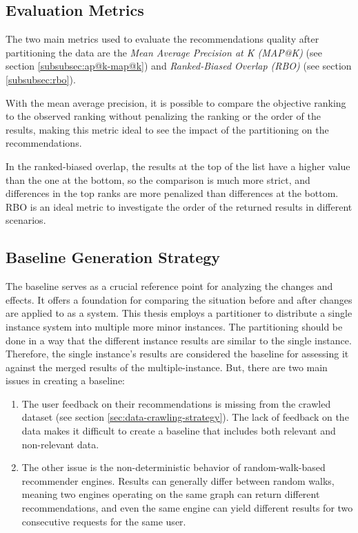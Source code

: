 \subsection{Evaluation Metrics}
\label{subsec:evaluation-metrics-for-recommendation-quality}
The two main metrics used to evaluate the recommendations quality after partitioning the data are the \emph{Mean Average Precision at K (MAP@K)} (see section \ref{subsubsec:ap@k-map@k})  and \emph{Ranked-Biased Overlap (RBO)} (see section \ref{subsubsec:rbo}). 


With the mean average precision, it is possible to compare the objective ranking to the observed ranking without penalizing the ranking or the order of the results, making this metric ideal to see the impact of the partitioning on the recommendations.


In the ranked-biased overlap, the results at the top of the list have a higher value than the one at the bottom, so the comparison is much more strict, and differences in the top ranks are more penalized than differences at the bottom. RBO is an ideal metric to investigate the order of the returned results in different scenarios.


\subsection{Baseline Generation Strategy}
\label{subsec:baseline-generation}
The baseline serves as a crucial reference point for analyzing the changes and effects. It offers a foundation for comparing the situation before and after changes are applied to as a system. This thesis employs a partitioner to distribute a single instance system into multiple more minor instances. The partitioning should be done in a way that the different instance results are similar to the single instance. Therefore, the single instance's results are considered the baseline for assessing it against the merged results of the multiple-instance. But, there are two main issues in creating a baseline:

\begin{enumerate}
    \item The user feedback on their recommendations is missing from the crawled dataset (see section \ref{sec:data-crawling-strategy}). The lack of feedback on the data makes it difficult to create a baseline that includes both relevant and non-relevant data.
    
    \item The other issue is the non-deterministic behavior of random-walk-based recommender engines. Results can generally differ between random walks, meaning two engines operating on the same graph can return different recommendations, and even the same engine can yield different results for two consecutive requests for the same user.
\end{enumerate}

